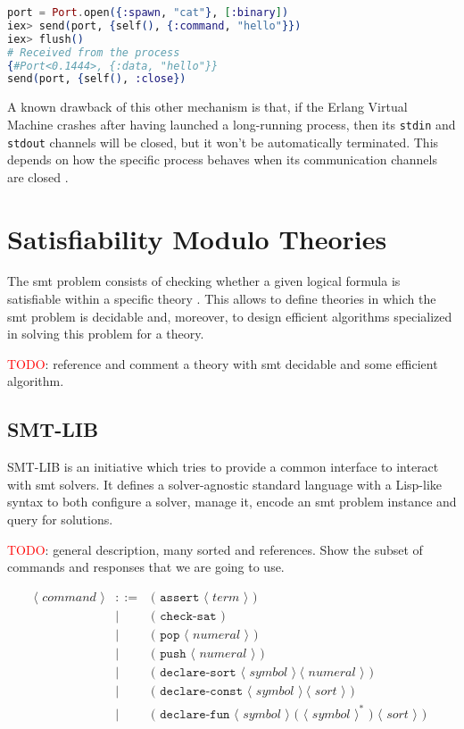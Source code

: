 \begin{lstlisting}[language=elixir,numbers=none,frame=none]
port = Port.open({:spawn, "cat"}, [:binary])
iex> send(port, {self(), {:command, "hello"}})
iex> flush()
# Received from the process
{#Port<0.1444>, {:data, "hello"}} 
send(port, {self(), :close})
\end{lstlisting}

A known drawback of this other mechanism is that, if the Erlang Virtual 
Machine crashes after having launched a long-running process, then its \verb|stdin| 
and \verb|stdout| channels will be closed, but it won't be automatically terminated.
This depends on how the specific process behaves when its communication channels are
closed \citep{ElixirDocs}.

\section{Satisfiability Modulo Theories}

The \gls{smt} problem consists of checking whether
a given logical formula is satisfiable within a specific theory
\citep{smtLibStandard}. This allows to define theories in which the \gls{smt} problem
is decidable and, moreover, to design efficient algorithms specialized in 
solving this problem for a theory.

\textcolor{red}{TODO}: reference and comment a theory with smt decidable and some 
efficient algorithm.

\subsection{SMT-LIB}
\label{prelim:smtlib}

SMT-LIB is an initiative which tries to provide a common interface to interact
with \acrshort{smt} solvers. It defines a solver-agnostic standard language
with a Lisp-like syntax to both configure a solver, manage it, encode an
\gls{smt} problem instance and query for solutions.

\textcolor{red}{TODO}: general description, many sorted and references. 
Show the subset of commands and responses that we are going to use.

\[
\begin{array}{rcll}
\langle\textit{ command }\rangle & ::= & \texttt{( assert } \langle\textit{ term }\rangle\texttt{ ) }\\
& | & \texttt{( check-sat )}\\
& | & \texttt{( pop } \langle\textit{ numeral }\rangle \texttt{ ) }\\
& | & \texttt{( push } \langle\textit{ numeral }\rangle \texttt{ ) }\\
& | & \texttt{( declare-sort } \langle\textit{ symbol }\rangle~\langle\textit{ numeral }\rangle\texttt{ ) }\\
& | & \texttt{( declare-const } \langle\textit{ symbol }\rangle~\langle\textit{ sort }\rangle\texttt{ ) }\\
& | & \texttt{( declare-fun } \langle\textit{ symbol }\rangle \texttt{ ( }\langle\textit{ symbol }\rangle^* \texttt{ ) }\langle\textit{ sort }\rangle\texttt{ ) }\\
\end{array}
\]

